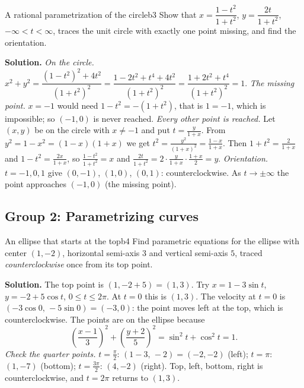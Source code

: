 \documentclass[11pt]{article}
\begin{document}
\begin{exmp}{A rational parametrization of the circle}{b3}
Show that $x=\dfrac{1-t^2}{1+t^2}$, $y=\dfrac{2t}{1+t^2}$, $-\infty<t<\infty$, traces the unit circle with exactly one point missing, and find the orientation.

\textbf{Solution.} \emph{On the circle.} $x^2+y^2=\dfrac{(1-t^2)^2+4t^2}{(1+t^2)^2}=\dfrac{1-2t^2+t^4+4t^2}{(1+t^2)^2}=\dfrac{1+2t^2+t^4}{(1+t^2)^2}=1$.
\emph{The missing point.} $x=-1$ would need $1-t^2=-(1+t^2)$, that is $1=-1$, which is impossible; so $(-1,0)$ is never reached. \emph{Every other point is reached.} Let $(x,y)$ be on the circle with $x\ne-1$ and put $t=\frac y{1+x}$. From $y^2=1-x^2=(1-x)(1+x)$ we get $t^2=\frac{y^2}{(1+x)^2}=\frac{1-x}{1+x}$. Then $1+t^2=\frac2{1+x}$ and $1-t^2=\frac{2x}{1+x}$, so $\frac{1-t^2}{1+t^2}=x$ and $\frac{2t}{1+t^2}=2\cdot\frac y{1+x}\cdot\frac{1+x}2=y$.
\emph{Orientation.} $t=-1,0,1$ give $(0,-1)$, $(1,0)$, $(0,1)$: counterclockwise. As $t\to\pm\infty$ the point approaches $(-1,0)$ (the missing point).
\end{exmp}

\subsection*{Group 2: Parametrizing curves}

\begin{exmp}{An ellipse that starts at the top}{b4}
Find parametric equations for the ellipse with center $(1,-2)$, horizontal semi-axis $3$ and vertical semi-axis $5$, traced \emph{counterclockwise} once from its top point.

\textbf{Solution.} The top point is $(1,-2+5)=(1,3)$. Try $x=1-3\sin t$, $y=-2+5\cos t$, $0\le t\le2\pi$. At $t=0$ this is $(1,3)$. The velocity at $t=0$ is $(-3\cos0,\,-5\sin0)=(-3,0)$: the point moves left at the top, which is counterclockwise. The points are on the ellipse because
\[
\left(\frac{x-1}3\right)^2+\left(\frac{y+2}5\right)^2=\sin^2t+\cos^2t=1.
\]
\emph{Check the quarter points.} $t=\frac\pi2$: $(1-3,\,-2)=(-2,-2)$ (left); $t=\pi$: $(1,-7)$ (bottom); $t=\frac{3\pi}2$: $(4,-2)$ (right). Top, left, bottom, right is counterclockwise, and $t=2\pi$ returns to $(1,3)$.
\end{exmp}
\end{document}

